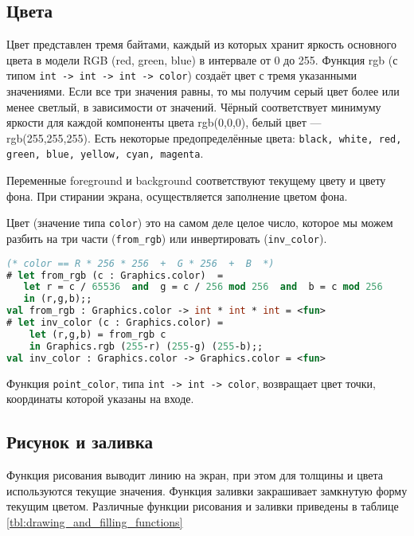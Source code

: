 \subsection{Цвета}
\label{subsec:colors}

Цвет представлен тремя байтами, каждый из которых хранит яркость основного
цвета в модели RGB (red, green, blue) в интервале от 0 до 255. Функция rgb (с
типом \texttt{int -> int -> int -> color}) создаёт цвет с тремя указанными
значениями. Если все три значения равны, то мы получим серый цвет более или
менее светлый, в зависимости от значений. Чёрный соответствует минимуму яркости
для каждой компоненты цвета rgb(0,0,0), белый цвет --- rgb(255,255,255). Есть
некоторые предопределённые цвета: \texttt{black, white, red, green, blue,
yellow, cyan, magenta}.

Переменные foreground и background соответствуют текущему цвету и цвету фона.
При стирании экрана, осуществляется заполнение цветом фона.

Цвет (значение типа \texttt{color}) это на самом деле целое число, которое мы
можем разбить на три части (\texttt{from\_rgb}) или инвертировать
(\texttt{inv\_color}).

\begin{lstlisting}[language=OCaml]
(* color == R * 256 * 256  +  G * 256  +  B  *)
# let from_rgb (c : Graphics.color)  =
   let r = c / 65536  and  g = c / 256 mod 256  and  b = c mod 256
   in (r,g,b);;
val from_rgb : Graphics.color -> int * int * int = <fun>
# let inv_color (c : Graphics.color) =
    let (r,g,b) = from_rgb c
    in Graphics.rgb (255-r) (255-g) (255-b);;
val inv_color : Graphics.color -> Graphics.color = <fun>
\end{lstlisting}

Функция \texttt{point\_color}, типа \texttt{int -> int -> color}, возвращает
цвет точки, координаты которой указаны на входе.

\subsection{Рисунок и заливка}
\label{subsec:drawing_and_filling}

Функция рисования выводит линию на экран, при этом для толщины и цвета
используются текущие значения. Функция заливки закрашивает замкнутую форму
текущим цветом. Различные функции рисования и заливки приведены в таблице
\ref{tbl:drawing_and_filling_functions}


